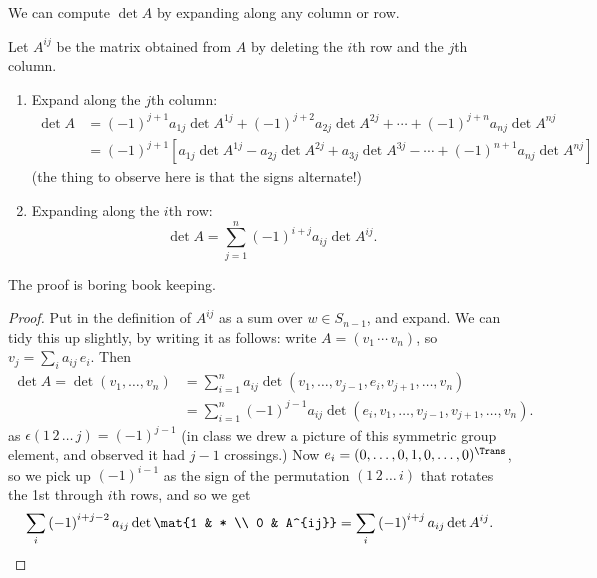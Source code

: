 We can compute $\det A$ by expanding along any column or row.

\begin{definition}
	Let $A^{ij}$ be the matrix obtained from $A$ by deleting the $i$th row and the $j$th column. %
\end{definition}

\begin{theorem}
	\begin{enumerate}
		\item Expand along the $j$th column:
		\begin{align*}
			   \det A
			&= \left( -1 \right)^{j+1} a_{1j} \det A^{1j}
			 + \left( -1 \right)^{j+2} a_{2j} \det A^{2j}
			 + \cdots
			 + \left( -1 \right)^{j+n} a_{nj} \det A^{nj} \\
			&= \left( -1 \right)^{j+1} \left[ a_{1j} \det A^{1j} - a_{2j} \det A^{2j} + a_{3j} \det A^{3j} - \cdots +\left( -1 \right)^{n+1} a_{nj} \det A^{nj} \right] %
		\end{align*}
(the thing to observe here is that the signs alternate!)
		\item Expanding along the $i$th row:
		\begin{equation*}
			\det A = \sum_{j=1}^n \left( -1 \right)^{i+j} a_{ij} \det A^{ij}.
		\end{equation*}
	\end{enumerate}%
\end{theorem}

The proof is boring book keeping.

\begin{proof} Put in the definition of $A^{ij}$ as a sum over $w\in S_{n-1}$, and expand. We can tidy this up slightly, by writing it as follows: write $A=\left( v_1\,\cdots\,v_n \right)$, so  $ v_j = \sum_i a_{ij} \, e_i$. Then
	\begin{align*}
	 	\det A
		 = \det(v_1,\ldots,v_n)
		&= \sum_{i=1}^n a_{ij} \det(v_1,\ldots,v_{j-1},e_i,v_{j+1},\ldots,v_n) \\
		&= \sum_{i=1}^n \left( -1 \right)^{j-1} a_{ij} \det\left( e_i,v_1,\ldots,v_{j-1},v_{j+1}, \ldots, v_n \right). %
	\end{align*}
	as $\epsilon(1 \,2\,\ldots\,j) = (-1)^{j-1}$ (in class we drew a picture of this symmetric group element, and observed it had $j-1$ crossings.) Now $e_i=(0,\ldots,0,1,0,\ldots,0)^\Trans$, so we pick up $\left( -1 \right)^{i-1}$ as the sign of the permutation $(1 \,2\,\ldots\,i )$ that rotates the 1st through $i$th rows, and so we get
	\begin{equation*}
		\sum_i \left( -1 \right)^{i+j-2} a_{ij} \det\mat{1 & * \\ 0 & A^{ij}} = \sum_i \left( -1 \right)^{i+j} a_{ij} \det A^{ij}. \qedhere %
	\end{equation*}
\end{proof}

